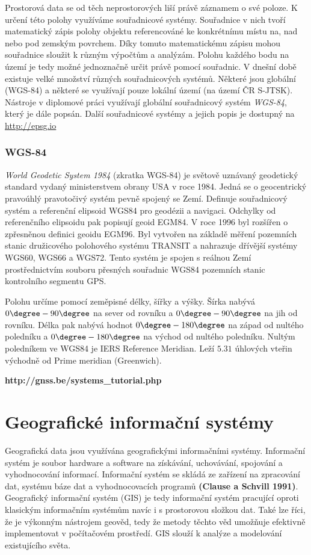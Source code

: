 Prostorová data se od těch neprostorových liší právě záznamem o své poloze. K určení této polohy využíváme souřadnicové systémy. Souřadnice v nich tvoří matematický zápis polohy objektu referencováné ke konkrétnímu místu na, nad nebo pod zemským povrchem. Díky tomuto matematickému zápisu mohou souřadnice sloužit k různým výpočtům a analýzám. Polohu každého bodu na území je tedy možné jednoznačně určit právě pomocí souřadnic. V dnešní době existuje velké množství různých souřadnicových systémů. Některé jsou globální (WGS-84) a některé se využívají pouze lokální území (na území ČR S-JTSK). Nástroje v diplomové práci využívají globální souřadnicový systém \textit{WGS-84}, který je dále popsán. Další souřadnicové systémy a jejich popis je dostupný na \url{http://epsg.io}

\subsubsection{WGS-84}
\label{subsubsection:wgs}

\textit{World Geodetic System 1984} (zkratka WGS-84) je světově uznávaný geodetický standard vydaný ministerstvem obrany USA v roce 1984. Jedná se o geocentrický pravoúhlý pravotočivý systém pevně spojený se Zemí. Definuje souřadnicový systém a referenční elipsoid WGS84 pro geodézii a navigaci. Odchylky od referenčního elipsoidu pak popisují geoid EGM84. V roce 1996 byl rozšířen o zpřesněnou definici geoidu EGM96. Byl vytvořen na základě měření pozemních stanic družicového polohového systému TRANSIT a nahrazuje dřívější systémy WGS60, WGS66 a WGS72. Tento systém je spojen s reálnou Zemí prostřednictvím souboru přesných souřadnic WGS84 pozemních stanic kontrolního segmentu GPS.

Polohu určíme pomocí zeměpisné délky, šířky a výšky. Šírka nabývá $0\degree-90\degree$ na sever od rovníku a $0\degree-90\degree$ na jih od rovníku. Délka pak nabývá hodnot $0\degree-180\degree$ na západ od nultého poledníku a $0\degree- 180\degree$ na východ od nultého poledníku. Nultým poledníkem ve WGS84 je IERS Reference Meridian. Leží $5.31$ úhlových vteřin východně od Prime meridian (Greenwich).

\textbf{http://gnss.be/systems\_tutorial.php}

\section{Geografické informační systémy}
\label{section:GIS}

Geografická data jsou využívána geografickými informačními systémy. Informační systém je soubor hardware a software na získávání, uchovávání, spojování a vyhodnocování informací. Informační systém se skládá ze zařízení na zpracování dat, systému báze dat a vyhodnocovacích programů \textbf{(Clause a Schvill 1991)}. Geografický informační systém (GIS) je tedy informační systém pracující oproti klasickým informačním systémům navíc i s prostorovou složkou dat. Také lze říci, že je výkonným nástrojem geověd, tedy že metody těchto věd umožňuje efektivně implementovat v počítačovém prostředí. GIS slouží k analýze a modelování existujícího světa. 

